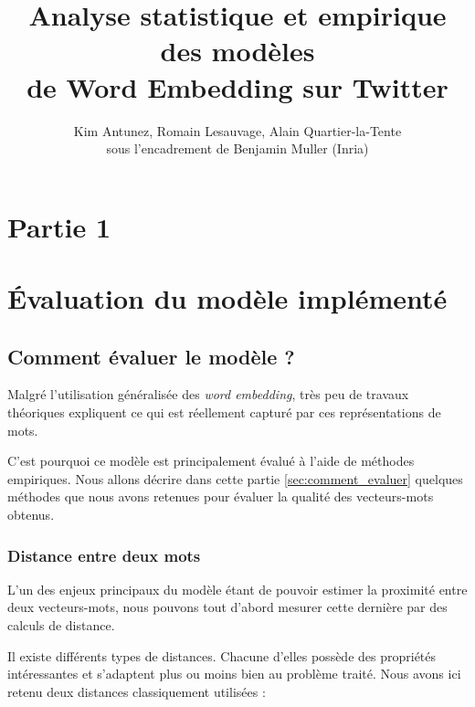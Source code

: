 \documentclass[11pt,french,french]{article}
\title{Analyse statistique et empirique des modèles\\
de Word Embedding sur Twitter}
\author{Kim Antunez, Romain Lesauvage, Alain Quartier-la-Tente\\
sous l'encadrement de Benjamin Muller (Inria)}
\date{}
\begin{document}
\maketitle


\hypertarget{partie-1}{%
\section{Partie 1}\label{partie-1}}

\label{sec:word2vec}

\hypertarget{uxe9valuation-du-moduxe8le-impluxe9mentuxe9}{%
\section{Évaluation du modèle
implémenté}\label{uxe9valuation-du-moduxe8le-impluxe9mentuxe9}}

\hypertarget{comment-uxe9valuer-le-moduxe8le}{%
\subsection{Comment évaluer le modèle
?}\label{comment-uxe9valuer-le-moduxe8le}}

\label{sec:comment_evaluer}

Malgré l'utilisation généralisée des \emph{word embedding}, très peu de
travaux théoriques expliquent ce qui est réellement capturé par ces
représentations de mots.

C'est pourquoi ce modèle est principalement évalué à l'aide de méthodes
empiriques. Nous allons décrire dans cette partie
\ref{sec:comment_evaluer} quelques méthodes que nous avons retenues pour
évaluer la qualité des vecteurs-mots obtenus.

\hypertarget{distance-entre-deux-mots}{%
\subsubsection{Distance entre deux
mots}\label{distance-entre-deux-mots}}

L'un des enjeux principaux du modèle étant de pouvoir estimer la
proximité entre deux vecteurs-mots, nous pouvons tout d'abord mesurer
cette dernière par des calculs de distance.

Il existe différents types de distances. Chacune d'elles possède des
propriétés intéressantes et s'adaptent plus ou moins bien au problème
traité. Nous avons ici retenu deux distances classiquement utilisées :
\end{document}

